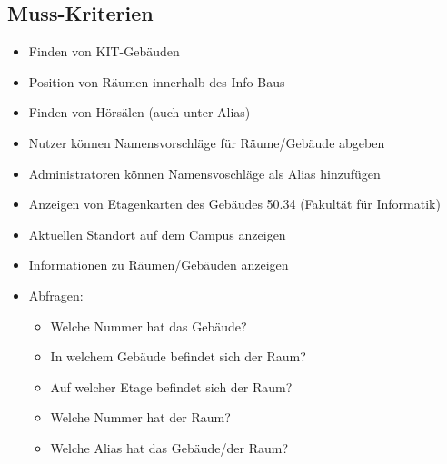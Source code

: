 \subsection{Muss-Kriterien}

\begin{itemize}

    \item Finden von KIT-Gebäuden
    \item Position von Räumen innerhalb des Info-Baus
    \item Finden von Hörsälen (auch unter Alias)
    \item Nutzer können Namensvorschläge für Räume/Gebäude abgeben
    \item Administratoren können Namensvoschläge als Alias hinzufügen
    \item Anzeigen von Etagenkarten des Gebäudes 50.34 (Fakultät für Informatik)
    \item Aktuellen Standort auf dem Campus anzeigen
    \item Informationen zu Räumen/Gebäuden anzeigen
    \item Abfragen:
        \begin{itemize}
            \item Welche Nummer hat das Gebäude?
            \item In welchem Gebäude befindet sich der Raum?
            \item Auf welcher Etage befindet sich der Raum?
            \item Welche Nummer hat der Raum?
            \item Welche Alias hat das Gebäude/der Raum?
        \end{itemize}


\end{itemize}
